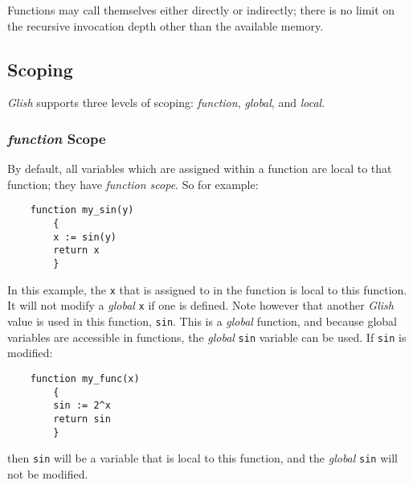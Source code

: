 Functions may call themselves either directly or indirectly; there is
no limit on the recursive invocation depth other than the available
memory.

\subsection{Scoping}
\label{scoping}

{\em Glish} supports three levels of scoping: {\em function}, {\em global}, and
{\em local\/}.

\subsubsection{{\em function} Scope}
By default, all variables which are assigned within a
function are local to that function; they have {\em function scope}. So for
example:
\begin{verbatim}
    function my_sin(y)
        { 
        x := sin(y)
        return x
        }
\end{verbatim}
In this example, the {\tt x} that is  assigned to in the function
is local to this function. It will not modify a {\em global} {\tt x} if one
is defined. Note however that another {\em Glish} 
value is used in this function,
{\tt sin}. This is a {\em global} function, and because  global variables are
accessible in functions, the {\em global} {\tt sin} variable can be used. If {\tt sin}
is modified:
\begin{verbatim}
    function my_func(x)
        {
        sin := 2^x
        return sin
        }
\end{verbatim}
then {\tt sin} will be a variable that  is local to this function, and the
{\em global} {\tt sin} will not be modified.
    
